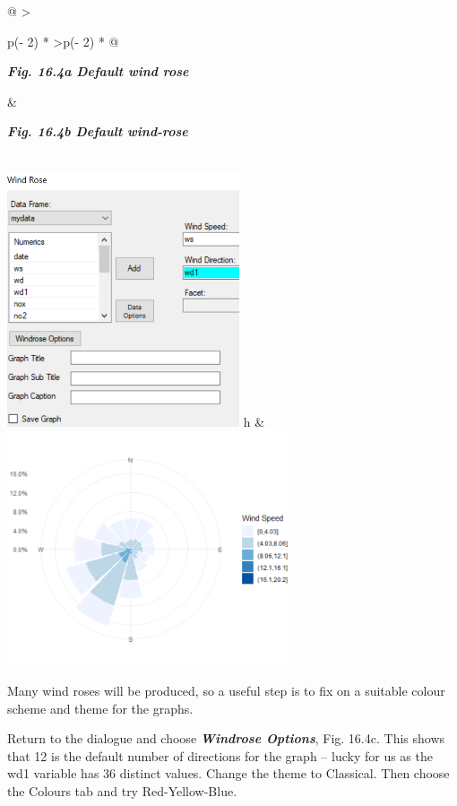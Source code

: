 \documentclass[
  letterpaper,
  DIV=11,
  numbers=noendperiod]{scrreprt}
\begin{document}
\begin{longtable}[]{@{}
  >{\raggedright\arraybackslash}p{(\columnwidth - 2\tabcolsep) * }
  >{\centering\arraybackslash}p{(\columnwidth - 2\tabcolsep) * }@{}}
\toprule\noalign{}
\begin{minipage}[b]{\linewidth}\raggedright
\textbf{\emph{Fig. 16.4a Default wind rose}}
\end{minipage} & \begin{minipage}[b]{\linewidth}\centering
\textbf{\emph{Fig. 16.4b Default wind-rose}}
\end{minipage} \\
\midrule\noalign{}
\endhead
\bottomrule\noalign{}
\endlastfoot
\includegraphics[width=2.70004in,height=2.97004in]{figures/Fig16.4a.png}
h &
\includegraphics[width=3.27953in,height=\textheight]{figures/Fig16.4b.png} \\
\end{longtable}

Many wind roses will be produced, so a useful step is to fix on a
suitable colour scheme and theme for the graphs.

Return to the dialogue and choose \textbf{\emph{Windrose Options}}, Fig.
16.4c. This shows that 12 is the default number of directions for the
graph -- lucky for us as the wd1 variable has 36 distinct values. Change
the theme to Classical. Then choose the Colours tab and try
Red-Yellow-Blue.
\end{document}
